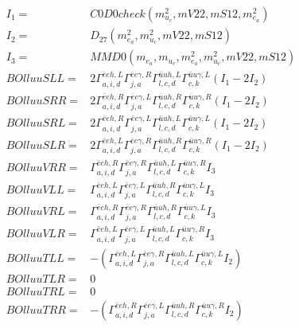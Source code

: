 \documentclass[A4,landscape]{article}
\begin{document}
\begin{align} 
I_1 = & C0D0check(m^2_{u_{{c}}}, mV22, mS12, m^2_{e_{{a}}}) \\ 
I_2 = & D_{27}(m^2_{e_{{a}}}, m^2_{u_{{c}}}, mV22, mS12) \\ 
I_3 = & MMD0(m_{e_{{a}}}, m_{u_{{c}}}, m^2_{e_{{a}}}, m^2_{u_{{c}}}, mV22, mS12) \\ 
  BOlluuSLL= & 2  \Gamma^{\bar{e}e h ,L}_{a, i, d} \Gamma^{\bar{e}e \gamma ,R}_{j, a} \Gamma^{\bar{u}u h ,L}_{l, c, d} \Gamma^{\bar{u}u \gamma ,L}_{c, k} (I_1 - 2 I_2) \\ 
  BOlluuSRR= & 2  \Gamma^{\bar{e}e h ,R}_{a, i, d} \Gamma^{\bar{e}e \gamma ,L}_{j, a} \Gamma^{\bar{u}u h ,R}_{l, c, d} \Gamma^{\bar{u}u \gamma ,R}_{c, k} (I_1 - 2 I_2) \\ 
  BOlluuSRL= & 2  \Gamma^{\bar{e}e h ,R}_{a, i, d} \Gamma^{\bar{e}e \gamma ,L}_{j, a} \Gamma^{\bar{u}u h ,L}_{l, c, d} \Gamma^{\bar{u}u \gamma ,L}_{c, k} (I_1 - 2 I_2) \\ 
  BOlluuSLR= & 2  \Gamma^{\bar{e}e h ,L}_{a, i, d} \Gamma^{\bar{e}e \gamma ,R}_{j, a} \Gamma^{\bar{u}u h ,R}_{l, c, d} \Gamma^{\bar{u}u \gamma ,R}_{c, k} (I_1 - 2 I_2) \\ 
  BOlluuVRR= &  \Gamma^{\bar{e}e h ,R}_{a, i, d} \Gamma^{\bar{e}e \gamma ,R}_{j, a} \Gamma^{\bar{u}u h ,L}_{l, c, d} \Gamma^{\bar{u}u \gamma ,R}_{c, k} I_3 \\ 
  BOlluuVLL= &  \Gamma^{\bar{e}e h ,L}_{a, i, d} \Gamma^{\bar{e}e \gamma ,L}_{j, a} \Gamma^{\bar{u}u h ,R}_{l, c, d} \Gamma^{\bar{u}u \gamma ,L}_{c, k} I_3 \\ 
  BOlluuVRL= &  \Gamma^{\bar{e}e h ,R}_{a, i, d} \Gamma^{\bar{e}e \gamma ,R}_{j, a} \Gamma^{\bar{u}u h ,R}_{l, c, d} \Gamma^{\bar{u}u \gamma ,L}_{c, k} I_3 \\ 
  BOlluuVLR= &  \Gamma^{\bar{e}e h ,L}_{a, i, d} \Gamma^{\bar{e}e \gamma ,L}_{j, a} \Gamma^{\bar{u}u h ,L}_{l, c, d} \Gamma^{\bar{u}u \gamma ,R}_{c, k} I_3 \\ 
  BOlluuTLL= & -( \Gamma^{\bar{e}e h ,L}_{a, i, d} \Gamma^{\bar{e}e \gamma ,R}_{j, a} \Gamma^{\bar{u}u h ,L}_{l, c, d} \Gamma^{\bar{u}u \gamma ,L}_{c, k} I_2) \\ 
  BOlluuTLR= & 0 \\ 
  BOlluuTRL= & 0 \\ 
  BOlluuTRR= & -( \Gamma^{\bar{e}e h ,R}_{a, i, d} \Gamma^{\bar{e}e \gamma ,L}_{j, a} \Gamma^{\bar{u}u h ,R}_{l, c, d} \Gamma^{\bar{u}u \gamma ,R}_{c, k} I_2) \\ 
\end{align} 
\end{document}
